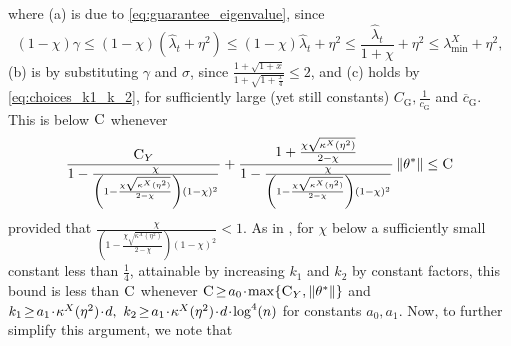 \documentclass[11pt]{article}
\theoremstyle{definition}
\theoremstyle{plain}
\newcommand{\Norm}[1]{\left\| #1 \right\|}
\providecommand{\norm}[1]{\Norm{#1}}
\begin{document}
where (a) is due to \eqref{eq:guarantee_eigenvalue}, since
\begin{equation}
    \label{eq:inequality_eigenvalues_gamma}
    \left(1 - \chi\right)\gamma \leq \left(1 - \chi\right)\left(\widehat{\lambda}_t + \eta^2\right) \leq \left(1 - \chi\right)\widehat{\lambda}_t + \eta^2 \leq \frac{\widehat{\lambda}_t}{1 + \chi} + \eta^2 \leq \lambda^{X}_{\min} + \eta^2,
\end{equation}
(b) is by substituting $\gamma$ and $\sigma$, since $\frac{1 + \sqrt{1 + x}}{1 + \sqrt{1 + \frac{x}{4}}} \leq 2$, and (c) holds by \eqref{eq:choices_k1_k_2}, for sufficiently large (yet still constants) $C_{\mathrm{G}}, \frac{1}{c_{\mathrm{G}}}$ and $\overline{c}_{\mathrm{G}}$. This is below $\textsc{C}$ whenever
\begin{equation}
    \frac{\textsc{C}_Y}{1 - \frac{\chi}{\left(1 - \frac{\chi\sqrt{\kappa^{X}(\eta^2)}}{2-\chi}\right)(1-\chi)^2}} + \frac{1 + \frac{\chi\sqrt{\kappa^{X}(\eta^2)}}{2-\chi}}{1 - \frac{\chi}{\left(1 - \frac{\chi\sqrt{\kappa^{X}(\eta^2)}}{2-\chi}\right)(1-\chi)^2}}\norm{\theta^{*}} \leq \textsc{C}
\end{equation}
provided that $\frac{\chi}{\left(1 - \frac{\chi\sqrt{\kappa^{X}(\eta^2)}}{2-\chi}\right)(1-\chi)^2} < 1$. As in \citet[Appendix.~C]{lev2026near}, for $\chi$ below a sufficiently small constant less than $\frac{1}{4}$, attainable by increasing $k_1$ and $k_2$ by constant factors, this bound is less than $\textsc{C}$ whenever $\textsc{C} \hspace{-0.15em}\geq\hspace{-0.15em} a_0 \hspace{-0.15em}\cdot\hspace{-0.15em} \max\hspace{-0.15em}\left\{\textsc{C}_Y, \norm{\theta^{*}}\right\}$ and $k_1 \hspace{-0.15em}\geq\hspace{-0.15em} a_1\hspace{-0.15em}\cdot\hspace{-0.15em}\kappa^{X}(\eta^2)\hspace{-0.15em}\cdot\hspace{-0.15em} d, \ k_2 \hspace{-0.15em}\geq\hspace{-0.15em} a_1\hspace{-0.15em}\cdot\hspace{-0.15em}\kappa^{X}(\eta^2)\hspace{-0.15em}\cdot\hspace{-0.15em} d\hspace{-0.15em}\cdot\hspace{-0.15em} \log^4(n)$ for constants $a_0, a_1$. Now, to further simplify this argument, we note that 
\end{document}
